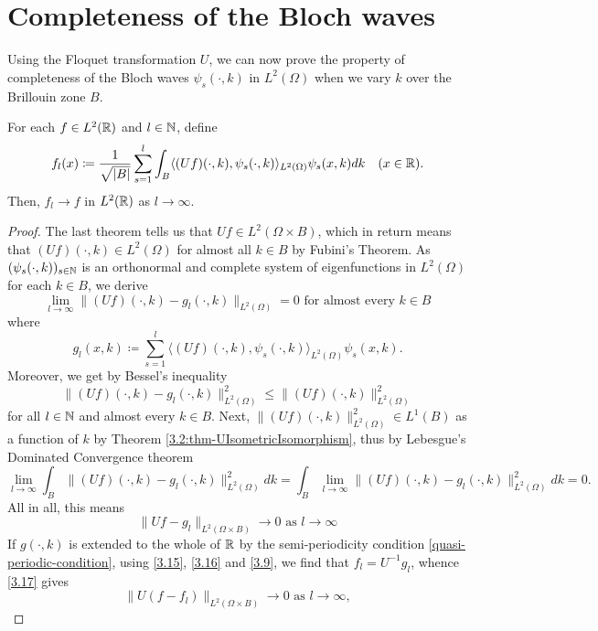 \section{Completeness of the Bloch waves}

Using the Floquet transformation $U$, we can now prove the property of completeness of the Bloch waves $\psi_{s}(\cdot, k)$ in $L^{2}(\Omega)$ when we vary $k$ over the Brillouin zone $B$.
	
\begin{theorem} \label{3.3:thm-flConvergence}
		For each $f \in L^{2}(\mathbb{R})$ and $l \in \mathbb{N}$, define
			\begin{equation}
				f_{l}(x) \coloneqq \frac{1}{\sqrt{|B|}} \sum_{s=1}^{l} \int_{B} \langle (Uf)(\cdot, k), \psi_{s}(\cdot, k) \rangle_{L^{2}(\Omega)} \psi_{s}(x, k) dk \quad (x \in \mathbb{R}). \label{3.15}
			\end{equation}
		Then, $f_{l} \rightarrow f$ in $L^{2}(\mathbb{R})$ as $l \rightarrow \infty$.

	\begin{proof}
		The last theorem tells us that $Uf \in L^{2}(\Omega \times B)$, which in return means that $(Uf)(\cdot, k) \in L^{2}(\Omega)$ for almost all $k \in B$ by Fubini's Theorem. As $(\psi_{s}(\cdot, k))_{s \in \mathbb{N}}$ is an orthonormal and complete system of eigenfunctions in $L^{2}(\Omega)$ for each $k \in B$, we derive
			\[ \lim_{l \rightarrow \infty} \| (Uf)(\cdot, k) - g_{l}(\cdot, k) \|_{L^{2}(\Omega)} = 0 \text{ for almost every } k \in B \]
		where 
			\begin{equation}
				g_{l}(x, k) \coloneqq \sum_{s=1}^{l} \langle(Uf)(\cdot, k), \psi_{s}(\cdot,k)\rangle_{L^{2}(\Omega)} \psi_{s}(x,k). \label{3.16}
			\end{equation}
		Moreover, we get by Bessel's inequality
			\[ \| (Uf)(\cdot, k) - g_{l}(\cdot, k) \|^{2}_{L^{2}(\Omega)} \leq \| (Uf)(\cdot, k) \|^{2}_{L^{2}(\Omega)}  \]
		for all $l \in \mathbb{N}$ and almost every $k \in B$. Next, $\|(Uf)(\cdot, k)\|^{2}_{L^{2}(\Omega)} \in L^{1}(B)$ as a function of $k$ by Theorem \ref{3.2:thm-UIsometricIsomorphism}, thus by Lebesgue's Dominated Convergence theorem
		\[ \lim_{l \rightarrow \infty} \int_{B} \| (Uf)(\cdot, k) - g_{l}(\cdot, k) \|^{2}_{L^{2}(\Omega)} dk  = \int_{B} \lim_{l \rightarrow \infty}  \| (Uf)(\cdot, k) - g_{l}(\cdot, k) \|^{2}_{L^{2}(\Omega)} dk = 0. \]
		  All in all, this means
			\begin{equation}
				\| U f - g_{l} \|_{L^{2}(\Omega \times B)} \rightarrow 0 \text{ as } l \rightarrow \infty \label{3.17}
			\end{equation} 
		 If $g(\cdot, k)$ is extended to the whole of $\mathbb{R}$ by the semi-periodicity condition \eqref{quasi-periodic-condition}, using \eqref{3.15}, \eqref{3.16} and \eqref{3.9}, we find that $f_{l} = U^{-1}g_{l}$, whence \eqref{3.17} gives
			\[ \| U(f - f_{l}) \|_{L^{2}(\Omega \times B)} \rightarrow 0 \text{ as } l \rightarrow \infty,\]
	\end{proof}
\end{theorem}